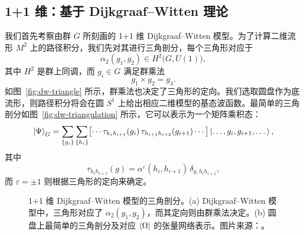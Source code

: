 \subsection{1+1 维：基于 Dijkgraaf--Witten 理论}

我们首先考察由群 $G$ 所刻画的 1+1 维 Dijkgraaf--Witten 模型\cite{dijkgraaf1990topological}。为了计算二维流形 $M^2$ 上的路径积分，我们先对其进行三角剖分，每个三角形对应于
\begin{equation}
  \alpha_2(g_1, g_2) \in H^2 \bigl( G, U(1) \bigr),
\end{equation}
其中 $H^2$ 是群上同调，而 $g_i\in G$ 满足群乘法
\begin{equation}
  g_1 \times g_2 = g_3.
\end{equation}
如图~\ref{fig:dw-triangle} 所示，群乘法也决定了三角形的定向。我们选取圆盘作为底流形，则路径积分将会在圆 $S^1$ 上给出相应二维模型的基态波函数。最简单的三角剖分如图~\ref{fig:dw-triangulation} 所示，它可以表示为一个矩阵乘积态：
\begin{equation}
    \ket{\Psi}_G
  = \sum_{\{g_i\}} \sum_{\{h_i\}}
    \bigl[ \cdots \tau_{h_i h_{i+1}}(g_i) \, \tau_{h_{i+1} h_{i+2}}(g_{i+1}) \cdots \bigr]
    \ket{\dots, g_i, g_{i+1}, \dots},
\end{equation}
其中
\begin{equation}
  \tau_{h_i h_{i+1}}(g) = \alpha^\varepsilon(h_i, h_{i+1}) \, \delta_{g, h_i h_{i+1}},
\end{equation}
而 $\varepsilon=\pm1$ 则根据三角形的定向来确定。

\begin{figure}[htb]
  \centering
   \quad
  \caption[1+1 维 Dijkgraaf--Witten 模型的三角剖分]{1+1 维 Dijkgraaf--Witten 模型的三角剖分。(a) Dijkgraaf--Witten 模型中，三角形对应了 $\alpha_2(g_1, g_2)$，而其定向则由群乘法决定。(b) 圆盘上最简单的三角剖分及对应 $\bra{\Omega}$ 的张量网络表示。图片来源：\parencite{chen2022exact}。}
\end{figure}


